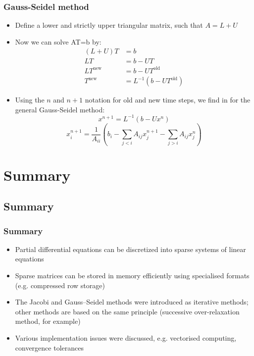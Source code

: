\begin{frame}[fragile]
  \frametitle{Gauss-Seidel method}
  \begin{itemize}
    \item Define a lower and strictly upper triangular matrix, such that $A = L + U$
    \item Now we can solve AT=b by:
    \begin{align*}
      (L+U)T &= b \\
      LT &= b - UT \\
      LT^\text{new} &= b - UT^\text{old} \\
      T^\text{new} &= L^{-1}(b-UT^\text{old})
   \end{align*}
     \item Using the $n$ and $n+1$ notation for old and new time steps, we find in for the general Gauss-Seidel method:
     \[
      x^{n+1} = L^{-1}\left(b-Ux^n\right)
     \]
     \[
      x_i^{n+1} = \frac{1}{A_{ii}}\left(b_i - \sum_{j<i} A_{ij}x_j^{n+1}- \sum_{j>i} A_{ij}x_j^n\right)
     \]
  \end{itemize}
\end{frame}

\section{Summary}
\subsection*{Summary}
\begin{frame}[fragile]
  \frametitle{Summary}
  \begin{itemize}
    \item Partial differential equations can be discretized into sparse systems of linear equations
    \item Sparse matrices can be stored in memory efficiently using specialised formats (e.g. compressed row storage)
    \item The Jacobi and Gauss–Seidel methods were introduced as iterative methods; other methods are based on the same principle (successive over-relaxation method, for example)
    \item Various implementation issues were discussed, e.g. vectorised computing, convergence tolerances
  \end{itemize}
\end{frame}

